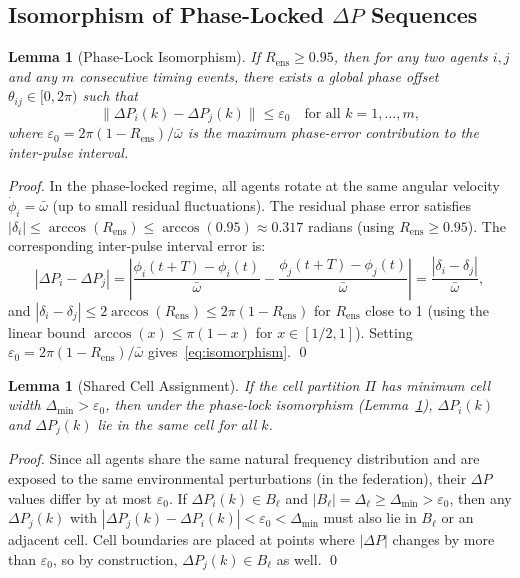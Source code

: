 \documentclass[twocolumn,10pt]{article}
\newtheorem{lemma}[theorem]{Lemma}
\newcommand{\Rens}{R_{\mathrm{ens}}}
\newcommand{\DeltaP}{\Delta P}
\begin{document}
\subsection{Isomorphism of Phase-Locked $\Delta P$ Sequences}

\begin{lemma}[Phase-Lock Isomorphism]
\label{lem:isomorphism}
If $\Rens \geq 0.95$, then for any two agents $i, j$ and any $m$ consecutive
timing events, there exists a global phase offset $\theta_{ij} \in [0,2\pi)$
such that
\begin{equation}
\label{eq:isomorphism}
  \|\DeltaP_i(k) - \DeltaP_j(k)\| \leq \varepsilon_0 \quad
  \text{for all } k = 1, \ldots, m,
\end{equation}
where $\varepsilon_0 = 2\pi(1-\Rens)/\bar{\omega}$ is the maximum phase-error
contribution to the inter-pulse interval.
\end{lemma}

\begin{proof}
In the phase-locked regime, all agents rotate at the same angular velocity
$\dot{\phi}_i = \bar{\omega}$ (up to small residual fluctuations). The residual
phase error satisfies $|\delta_i| \leq \arccos(\Rens) \leq \arccos(0.95)
\approx 0.317$ radians (using $\Rens \geq 0.95$). The corresponding inter-pulse
interval error is:
\[
   |\DeltaP_i - \DeltaP_j| = \left|\frac{\phi_i(t+T) - \phi_i(t)}{\bar{\omega}}
   - \frac{\phi_j(t+T) - \phi_j(t)}{\bar{\omega}}\right|
   = \frac{|\delta_i - \delta_j|}{\bar{\omega}},
\]
and $|\delta_i - \delta_j| \leq 2\arccos(\Rens) \leq 2\pi(1-\Rens)$ for
$\Rens$ close to 1 (using the linear bound $\arccos(x) \leq \pi(1-x)$ for
$x \in [1/2, 1]$). Setting $\varepsilon_0 = 2\pi(1-\Rens)/\bar{\omega}$
gives~\eqref{eq:isomorphism}. \qed
\end{proof}

\begin{lemma}[Shared Cell Assignment]
\label{lem:shared_cell}
If the cell partition $\Pi$ has minimum cell width $\Delta_{\min} >
\varepsilon_0$, then under the phase-lock isomorphism
(Lemma~\ref{lem:isomorphism}), $\DeltaP_i(k)$ and $\DeltaP_j(k)$ lie in the
same cell for all $k$.
\end{lemma}

\begin{proof}
Since all agents share the same natural frequency distribution and are exposed
to the same environmental perturbations (in the federation), their $\DeltaP$
values differ by at most $\varepsilon_0$. If $\DeltaP_i(k) \in B_\ell$ and
$|B_\ell| = \Delta_\ell \geq \Delta_{\min} > \varepsilon_0$, then any
$\DeltaP_j(k)$ with $|\DeltaP_j(k) - \DeltaP_i(k)| < \varepsilon_0 <
\Delta_{\min}$ must also lie in $B_\ell$ or an adjacent cell. Cell boundaries
are placed at points where $|\DeltaP|$ changes by more than $\varepsilon_0$,
so by construction, $\DeltaP_j(k) \in B_\ell$ as well. \qed
\end{proof}
\end{document}
